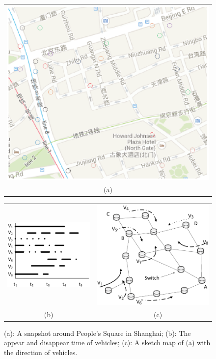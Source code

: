 \documentclass[journal]{IEEEtran}
\begin{document}
\begin{figure} [t]
\begin{center}
\begin{tabular}{c}
\includegraphics[width=0.85\columnwidth]{fig-e-map-26.eps} \\
(a)
\end{tabular}
\begin{tabular}{cc}
\includegraphics[width=0.45\columnwidth]{fig-e-length-2.eps}&
\hspace {-0.1in}
\includegraphics[width=0.45\columnwidth]{fig-e-map-s-26-1.eps} \\
(b) & ~~~(c)
\end{tabular}
\caption{(a): A snapshot around People's Square in Shanghai; (b): The appear and disappear time of vehicles; (c): A sketch map of (a) with the direction of vehicles.} \label{fig8a}
  \end{center}
  \vspace{-0.35in}
\end{figure}
\end{document}

